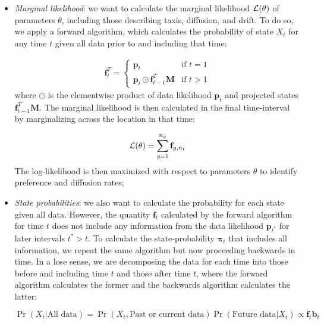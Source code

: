 \begin{itemize}
    \item \textit{Marginal likelihood}:  we want to calculate the marginal likelihood \(\operatorname{\mathcal{L}}(\theta)\) of parameters \(\theta\), including those describing taxis, diffusion, and drift.  To do so, we apply a forward algorithm, which calculates the probability of state \(X_t\) for any time \(t\) given all data prior to and including that time:

    \begin{equation}
    \begin{gathered}
        \mathbf{f}_{t}^T = 
        \begin{cases}
            \mathbf{p}_{t} & \text{if } t = 1  \\
            \mathbf{p}_{t} \odot \mathbf{f}_{t-1}^T \mathbf{M}  & \text{if } t > 1  
        \end{cases}
    \end{gathered}     
    \end{equation}
    where \( \odot \) is the elementwise product of data likelihood \( \mathbf{p}_{t} \) and projected states \( \mathbf{f}_{t-1}^T \mathbf{M} \). The marginal likelihood is then calculated in the final time-interval by marginalizing across the location in that time:
    
    \begin{equation}
        \operatorname{\mathcal{L}}(\theta) = \sum_{g=1}^{n_g} \mathbf{f}_{g,n_t}        
    \end{equation}
    The log-likelihood is then maximized with respect to parameters \( \theta \) to identify preference and diffusion rates;  

    \item \textit{State probabilities}:  we also want to calculate the probability for each state given all data.  However, the quantity \( \mathbf{f}_t \) calculated by the forward algorithm for time \(t\) does not include any information from the data likelihood \(\mathbf{p}_{t^*}\) for later intervals \( t^* > t\).  To calculate the state-probability \( \mathbf{\pi}_t \) that includes all information, we repeat the same algorithm but now proceeding backwards in time.  In a lose sense, we are decomposing the data for each time into those before and including time \(t\) and those after time \(t\), where the forward algorithm calculates the former and the backwards algorithm calculates the latter:
    
    \begin{equation}
        \Pr(X_t|\text{All data}) = \Pr(X_t,\text{Past or current data}) \Pr(\text{Future data}|X_t) \propto \mathbf{f}_t \mathbf{b}_t
    \end{equation}


\end{itemize}
